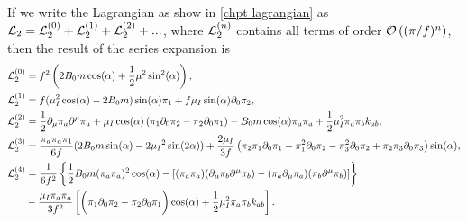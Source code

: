 \documentclass{article}
\begin{document}
If we write the Lagrangian as show in \autoref{chpt lagrangian} as $\Ell_2 = \Ell_2^{(0)} + \Ell_2^{(1)} + \Ell_2^{(2)} +...$, where $\Ell_2^{(n)}$ contains all terms of order $\Oh[n]{(\pi/f)}$, then the result of the series expansion is
\begin{align}
\Ell_2^{(0)}
&  =
    f^2   
    \left(
        2B_0m \cos(\alpha )
        + \frac{1}{2} \mu^2 \sin^2(\alpha )
    \right),
    \label{L0}
\\
\label{L1}
\Ell_2^{(1)}
& =
    f 
    (
        \mu_I^2\cos (\alpha)
        - 2B_0m
    )\sin (\alpha) \pi_1 
    + f \mu_I \sin(\alpha) \partial_0\pi_2,
\\
\Ell_2^{(2)}
& =
    \frac{1}{2} \partial_\mu\pi_a\partial^\mu\pi_a
    + \mu_I \cos(\alpha) \left( \pi_1 \partial_0\pi_2 - \pi_2\partial_0\pi_1 \right)
    - B_0m \cos(\alpha) \pi_a \pi_a
    + \frac{1}{2} \mu_I ^2 \pi_a \pi_b k_{ab},
\label{L2}
\\
\label{L3}
\Ell_2^{(3)}
& =
    \frac{\pi_a\pi_a \pi_1}{6f}
    (2B_0m \sin (\alpha )-2\mu_I{}^2 \sin (2\alpha ))
    + 
    \frac{2 \mu_I}{3 f}
    \left(
        \pi_2 \pi_1\partial_0\pi_1
        - \pi_1^2 \partial_0\pi_2
        - \pi_3^2\partial_0\pi_2
        + \pi_2 \pi_3 \partial_0\pi_3
    \right)\sin (\alpha),
\\
\notag
\Ell_2^{(4)}
& =
\frac{1}{6f^2}
\C{    
    \frac{1}{2} B_0m (\pi_a\pi_a)^2 \cos(\alpha)
    -
    \left[
        (\pi_a \pi_a) (\partial_\mu \pi_b \partial^\mu \pi_b )
        - (\pi_a \partial_\mu \pi_a)(\pi_b \partial^\mu \pi_b )
    \right]
}
\\
&
- \frac{\mu_I \pi_a\pi_a}{3f^2}
\left[
    \bigg(\pi_1\partial_0 \pi_2 - \pi_2 \partial_0 \pi_1\bigg) 
    \cos(\alpha)
    + \frac{1}{2} \mu_I ^2 \pi_a \pi_b k_{ab}
\right].
\label{L4}
\end{align}
\end{document}
